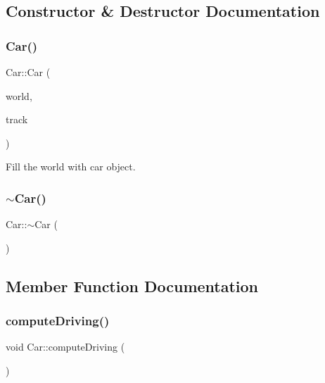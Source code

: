 \subsection{Constructor \& Destructor Documentation}
\mbox{\label{class_car_a7476a5a35b839770aebb08c8fac7505c}} 
\subsubsection{\texorpdfstring{Car()}{Car()}}
{\footnotesize\ttfamily Car\+::\+Car (\begin{DoxyParamCaption}\item[{\mbox{\hyperlink{classb2_world}{b2\+World}} $\ast$}]{world,  }\item[{\mbox{\hyperlink{class_track}{Track}} $\ast$}]{track }\end{DoxyParamCaption})}



Fill the world with car object. 

\mbox{\label{class_car_a5933bb06e96b159fe339a128abda888a}} 
\subsubsection{\texorpdfstring{$\sim$Car()}{~Car()}}
{\footnotesize\ttfamily Car\+::$\sim$\+Car (\begin{DoxyParamCaption}{ }\end{DoxyParamCaption})}



\subsection{Member Function Documentation}
\mbox{\label{class_car_aaa9dcb32944a41ce2a78d514416fc0ac}} 
\subsubsection{\texorpdfstring{computeDriving()}{computeDriving()}}
{\footnotesize\ttfamily void Car\+::compute\+Driving (\begin{DoxyParamCaption}{ }\end{DoxyParamCaption})}



